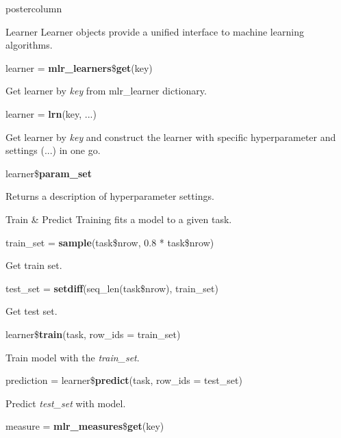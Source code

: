 \documentclass{beamer}
\newlength{\columnheight} %
\begin{document}
\begin{frame}[fragile]{}
\begin{columns}
\begin{column}{.245\textwidth}
\begin{beamercolorbox}[center]{postercolumn}
			\begin{minipage}{.98\textwidth}
				\parbox[t][\columnheight]{\textwidth}{
					\begin{myblock}{Learner}
						Learner objects provide a unified interface to machine learning algorithms.
						\\
						\begin{codebox}
							learner = \textbf{mlr\_learners}\$\textbf{get}(key)
						\end{codebox}
						 Get learner by \textit{key} from mlr\_learner dictionary.
						\\
						\begin{codebox}
							learner = \textbf{lrn}(key, ...)
						\end{codebox}
						 Get learner by \textit{key} and construct the learner with specific hyperparameter and settings (...) in one go.
						\\
						\begin{codebox}
							learner\$\textbf{param\_set}
						\end{codebox}
						Returns a description of hyperparameter settings.
					\end{myblock}
				\begin{myblock}{Train \& Predict}
					Training fits a model to a given task. 
					\\
					\begin{codebox}
						train\_set = \textbf{sample}(task\$nrow, 0.8 * task\$nrow)
					\end{codebox}
					Get train set.
					\\
					\begin{codebox}
						test\_set = \textbf{setdiff}(seq\_len(task\$nrow), train\_set)
					\end{codebox}
					Get test set.
					\\
					\begin{codebox}
						learner\$\textbf{train}(task, row\_ids = train\_set)
					\end{codebox}
					Train model with the \textit{train\_set}.
					\\
					\begin{codebox}
						prediction = learner\$\textbf{predict}(task, row\_ids = test\_set)
					\end{codebox}
					Predict \textit{test\_set} with model.
					\\
					\begin{codebox}
						measure = \textbf{mlr\_measures}\$\textbf{get}(key)
					\end{codebox}

\end{myblock}}
\end{minipage}
\end{beamercolorbox}
\end{column}
\end{columns}
\end{frame}
\end{document}
